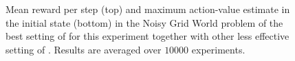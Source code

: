 \documentclass[conference]{IEEEtran}
\begin{document}
\begin{figure}[t]
\begin{minipage}{\columnwidth}
\end{minipage}
  \caption{Mean reward per step (top) and maximum action-value estimate in the initial state (bottom) in the Noisy Grid World problem of the best setting of \alg for this experiment together with other less effective setting of \alg. Results are averaged over $10000$ experiments.}
  \label{F:hasselt_QDecs}
\end{figure}
\begin{figure}[t]
\begin{minipage}{\columnwidth}
\centering

\end{minipage}
\end{figure}
\end{document}

